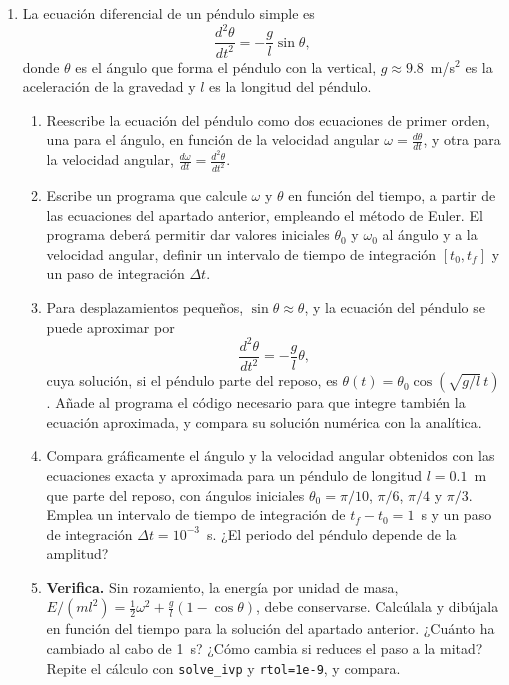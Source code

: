 \begin{enumerate}
\item \label{ej:pendulo} La ecuación diferencial de un péndulo simple es
\begin{equation*}
\frac{d^2\theta}{dt^2} =-\frac{g}{l}\sin\theta,
\end{equation*}
donde $\theta$ es el ángulo que forma el péndulo con la vertical, $g\approx9.8$~m/s$^2$ es la aceleración de la gravedad y $l$ es la longitud del péndulo.
\begin{enumerate}
\item Reescribe la ecuación del péndulo como dos ecuaciones de primer orden, una para el ángulo, en función de la velocidad angular $\omega = \frac{d\theta}{dt}$, y otra para la velocidad angular, $\frac{d\omega}{dt} = \frac{d^2\theta}{dt^2}$.
\item Escribe un programa que calcule $\omega$ y $\theta$ en función del tiempo, a partir de las ecuaciones del apartado anterior, empleando el método de Euler. El programa deberá permitir dar valores iniciales $\theta_0$ y $\omega_0$ al ángulo y a la velocidad angular, definir un intervalo de tiempo de integración $[t_0,t_f]$ y un paso de integración $\Delta t$.
\item Para desplazamientos pequeños, $\sin\theta \approx \theta$, y la ecuación del péndulo se puede aproximar por
\begin{equation*}
\frac{d^2\theta}{dt^2} =-\frac{g}{l}\theta,
\end{equation*}
cuya solución, si el péndulo parte del reposo, es $\theta(t)=\theta_0\cos(\sqrt{g/l}\,t)$. Añade al programa el código necesario para que integre también la ecuación aproximada, y compara su solución numérica con la analítica.
\item Compara gráficamente el ángulo y la velocidad angular obtenidos con las ecuaciones exacta y aproximada para un péndulo de longitud $l=0.1$~m que parte del reposo, con ángulos iniciales $\theta_0=\pi/10$, $\pi/6$, $\pi/4$ y $\pi/3$. Emplea un intervalo de tiempo de integración de $t_f-t_0 = 1$~s y un paso de integración $\Delta t=10^{-3}$~s. ¿El periodo del péndulo depende de la amplitud?
\item \textbf{Verifica.} Sin rozamiento, la energía por unidad de masa, $E/(ml^2)=\frac{1}{2}\omega^2+\frac{g}{l}(1-\cos\theta)$, debe conservarse. Calcúlala y dibújala en función del tiempo para la solución del apartado anterior. ¿Cuánto ha cambiado al cabo de 1~s? ¿Cómo cambia si reduces el paso a la mitad? Repite el cálculo con \texttt{solve\_ivp} y \texttt{rtol=1e-9}, y compara.
\end{enumerate}


\end{enumerate}
